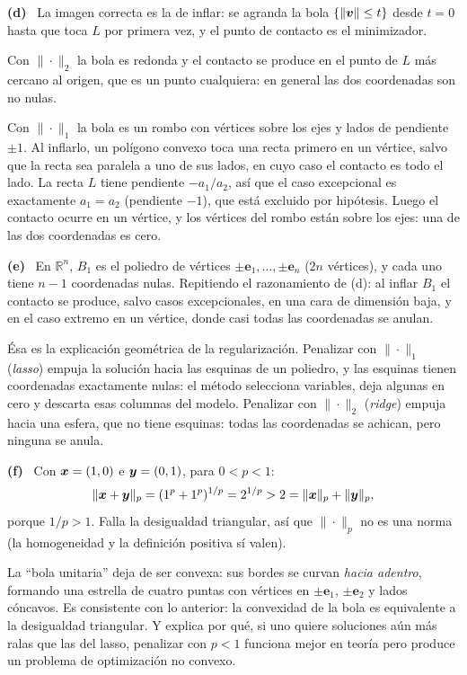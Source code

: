 \documentclass[11pt,a4paper]{article}
\newcommand{\bi}[1]{\boldsymbol{#1}}
\newcommand{\R}{\mathbb{R}}
\newcommand{\itemsol}[1]{\par\medskip\noindent\textbf{(#1)}\ \ignorespaces}
\begin{document}
\itemsol{d} La imagen correcta es la de inflar: se agranda la bola
$\{\|\bv\|\le t\}$ desde $t=0$ hasta que toca $L$ por primera vez, y el punto de
contacto es el minimizador.

Con $\|\cdot\|_2$ la bola es redonda y el contacto se produce en el punto de $L$
más cercano al origen, que es un punto cualquiera: en general las dos coordenadas
son no nulas.

Con $\|\cdot\|_1$ la bola es un rombo con vértices sobre los ejes y lados de
pendiente $\pm1$. Al inflarlo, un polígono convexo toca una recta primero en un
vértice, salvo que la recta sea paralela a uno de sus lados, en cuyo caso el
contacto es todo el lado. La recta $L$ tiene pendiente $-a_1/a_2$, así que el
caso excepcional es exactamente $a_1=a_2$ (pendiente $-1$), que está excluido por
hipótesis. Luego el contacto ocurre en un vértice, y los vértices del rombo están
sobre los ejes: una de las dos coordenadas es cero.

\itemsol{e} En $\R^n$, $B_1$ es el poliedro de vértices
$\pm\bi{e}_1,\dots,\pm\bi{e}_n$ ($2n$ vértices), y cada uno tiene $n-1$
coordenadas nulas. Repitiendo el razonamiento de (d): al inflar $B_1$ el contacto
se produce, salvo casos excepcionales, en una cara de dimensión baja, y en el
caso extremo en un vértice, donde casi todas las coordenadas se anulan.

Ésa es la explicación geométrica de la regularización. Penalizar con
$\|\cdot\|_1$ (\emph{lasso}) empuja la solución hacia las esquinas de un
poliedro, y las esquinas tienen coordenadas exactamente nulas: el método
selecciona variables, deja algunas en cero y descarta esas columnas del modelo.
Penalizar con $\|\cdot\|_2$ (\emph{ridge}) empuja hacia una esfera, que no tiene
esquinas: todas las coordenadas se achican, pero ninguna se anula.

\itemsol{f} Con $\bx=(1,0)$ e $\by=(0,1)$, para $0<p<1$:
\[
\|\bx+\by\|_p=(1^p+1^p)^{1/p}=2^{1/p}>2=\|\bx\|_p+\|\by\|_p ,
\]
porque $1/p>1$. Falla la desigualdad triangular, así que $\|\cdot\|_p$ no es una
norma (la homogeneidad y la definición positiva sí valen).

La ``bola unitaria'' deja de ser convexa: sus bordes se curvan \emph{hacia
adentro}, formando una estrella de cuatro puntas con vértices en $\pm\bi{e}_1$,
$\pm\bi{e}_2$ y lados cóncavos. Es consistente con lo anterior: la convexidad de
la bola es equivalente a la desigualdad triangular. Y explica por qué, si uno
quiere soluciones aún más ralas que las del lasso, penalizar con $p<1$ funciona
mejor en teoría pero produce un problema de optimización no convexo.
\end{document}
